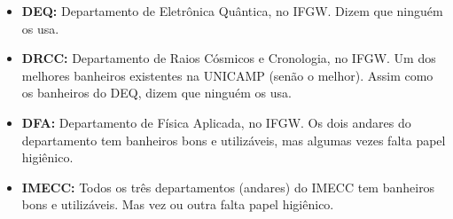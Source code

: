 \begin{itemize}
\item  \textbf{DEQ:} Departamento de Eletrônica Quântica, no IFGW. Dizem que ninguém os usa.
\end{itemize}

\begin{itemize}
\item  \textbf{DRCC:} Departamento de Raios Cósmicos e Cronologia, no IFGW. Um dos melhores banheiros existentes na UNICAMP (senão o melhor). Assim como os banheiros do DEQ, dizem que ninguém os usa.
\end{itemize}

\begin{itemize}
\item  \textbf{DFA:} Departamento de Física Aplicada, no IFGW. Os dois andares do departamento tem banheiros bons e utilizáveis, mas algumas vezes falta papel higiênico.
\end{itemize}

\begin{itemize}
\item  \textbf{IMECC:} Todos os três departamentos (andares) do IMECC tem banheiros bons e utilizáveis. Mas vez ou outra falta papel higiênico.
\end{itemize}
